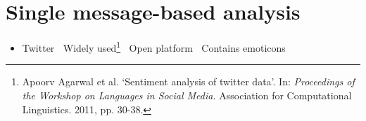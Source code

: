 \documentclass[
paper=128mm:96mm, %
fontsize=11pt, %
pagesize, %
parskip=half-, %
]{scrartcl} %
\newcommand{\red}[1]{\textit{\color{red}{#1}}}
\theoremstyle{mythmstyle} %
\begin{document}

\clearpage


\section{Single message-based analysis}


\begin{itemize}
\item Twitter
\subitem \textbullet $\:$ Widely used\footnote{Apoorv Agarwal et al. `Sentiment analysis of twitter data'. In: \textit{Proceedings of the Workshop on Languages in Social Media.} Association for Computational Linguistics. 2011, pp. 30-38. }
\subitem \textbullet $\:$ Open platform
\subitem \textbullet $\:$ Contains emoticons

\end{itemize}
\end{document}
